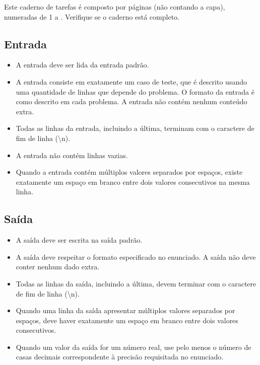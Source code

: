 Este caderno de tarefas é composto por \pageref{lastpage} páginas (não
contando a capa), numeradas 
de 1 a \pageref{lastpage}. Verifique se o caderno está completo.

\subsection*{Entrada}

\begin{itemize}
\item A entrada deve ser lida da entrada padrão.

\item A entrada consiste em exatamente um caso de teste, que é descrito usando uma
quantidade de linhas que depende do problema. O formato da entrada é como descrito
em cada problema. A entrada não contém nenhum conteúdo extra.

\item Todas as linhas da entrada, incluindo a última, terminam com o caractere de fim
de linha (\textbackslash n).

\item A entrada não contém linhas vazias.

\item Quando a entrada contém múltiplos valores separados por espaços, 
existe exatamente um espaço em branco entre dois valores consecutivos na mesma linha.

\end{itemize}

\subsection*{Saída}

\begin{itemize}

\item A saída deve ser escrita na saída padrão.

\item A saída deve respeitar o formato especificado no enunciado. A saída não deve
conter nenhum dado extra.

\item Todas as linhas da saída, incluindo a última, devem terminar com o caractere de fim
de linha (\textbackslash n).

\item Quando uma linha da saída apresentar múltiplos valores separados por espaços, deve haver
exatamente um espaço em branco entre dois valores consecutivos.

\item Quando um valor da saída for um número real, use pelo menos o número de casas decimais correspondente
à precisão requisitada no enunciado.

\end{itemize}
